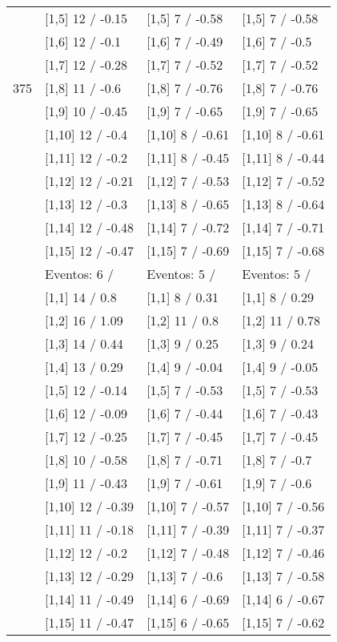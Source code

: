 \begin{table}
\begin{tabular}[t]{llll}
 & {}[1,5] 12  / -0.15 & {}[1,5] 7  / -0.58 & {}[1,5] 7  / -0.58\\
 & {}[1,6] 12  / -0.1 & {}[1,6] 7  / -0.49 & {}[1,6] 7  / -0.5\\
 & {}[1,7] 12  / -0.28 & {}[1,7] 7  / -0.52 & {}[1,7] 7  / -0.52\\
375 & {}[1,8] 11  / -0.6 & {}[1,8] 7  / -0.76 & {}[1,8] 7  / -0.76\\
\addlinespace
 & {}[1,9] 10  / -0.45 & {}[1,9] 7  / -0.65 & {}[1,9] 7  / -0.65\\
 & {}[1,10] 12  / -0.4 & {}[1,10] 8  / -0.61 & {}[1,10] 8  / -0.61\\
 & {}[1,11] 12  / -0.2 & {}[1,11] 8  / -0.45 & {}[1,11] 8  / -0.44\\
 & {}[1,12] 12  / -0.21 & {}[1,12] 7  / -0.53 & {}[1,12] 7  / -0.52\\
 & {}[1,13] 12  / -0.3 & {}[1,13] 8  / -0.65 & {}[1,13] 8  / -0.64\\
\addlinespace
 & {}[1,14] 12  / -0.48 & {}[1,14] 7  / -0.72 & {}[1,14] 7  / -0.71\\
 & {}[1,15] 12  / -0.47 & {}[1,15] 7  / -0.69 & {}[1,15] 7  / -0.68\\
 & Eventos:  6 / & Eventos:  5 / & Eventos:  5 /\\
 & {}[1,1] 14  / 0.8 & {}[1,1] 8  / 0.31 & {}[1,1] 8  / 0.29\\
 & {}[1,2] 16  / 1.09 & {}[1,2] 11  / 0.8 & {}[1,2] 11  / 0.78\\
\addlinespace
 & {}[1,3] 14  / 0.44 & {}[1,3] 9  / 0.25 & {}[1,3] 9  / 0.24\\
 & {}[1,4] 13  / 0.29 & {}[1,4] 9  / -0.04 & {}[1,4] 9  / -0.05\\
 & {}[1,5] 12  / -0.14 & {}[1,5] 7  / -0.53 & {}[1,5] 7  / -0.53\\
 & {}[1,6] 12  / -0.09 & {}[1,6] 7  / -0.44 & {}[1,6] 7  / -0.43\\
 & {}[1,7] 12  / -0.25 & {}[1,7] 7  / -0.45 & {}[1,7] 7  / -0.45\\
\addlinespace
500 & {}[1,8] 10  / -0.58 & {}[1,8] 7  / -0.71 & {}[1,8] 7  / -0.7\\
 & {}[1,9] 11  / -0.43 & {}[1,9] 7  / -0.61 & {}[1,9] 7  / -0.6\\
 & {}[1,10] 12  / -0.39 & {}[1,10] 7  / -0.57 & {}[1,10] 7  / -0.56\\
 & {}[1,11] 11  / -0.18 & {}[1,11] 7  / -0.39 & {}[1,11] 7  / -0.37\\
 & {}[1,12] 12  / -0.2 & {}[1,12] 7  / -0.48 & {}[1,12] 7  / -0.46\\
\addlinespace
 & {}[1,13] 12  / -0.29 & {}[1,13] 7  / -0.6 & {}[1,13] 7  / -0.58\\
 & {}[1,14] 11  / -0.49 & {}[1,14] 6  / -0.69 & {}[1,14] 6  / -0.67\\
 & {}[1,15] 11  / -0.47 & {}[1,15] 6  / -0.65 & {}[1,15] 7  / -0.62\\
\bottomrule
\end{tabular}
\end{table}
